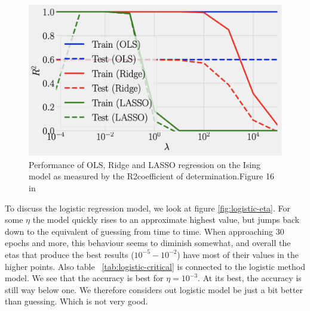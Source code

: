 \begin{figure}[H]
\includegraphics[width = 0.6\paperwidth]{figures/R2_article.png}
\caption{Performance of OLS, Ridge and LASSO regression on the Ising model as measured by the R2coefficient of determination.Figure 16 in ~\cite{HighBias}} 
\label{fig:regression-r2-article}
\end{figure}

To discuss the logistic regression model, 
we look at figure \ref{fig:logistic-eta}. For some $\eta$ the model 
quickly rises to an approximate highest value, but jumps back down to 
the equivalent of guessing from time
to time. When approaching 30 epochs and more, this behaviour 
seems to diminish somewhat, and overall the etas that produce 
the best results ($10^{-5} - 10^{-2}$) have most of their values
in the higher points.
Also table ~\ref{tab:logistic-critical} is connected 
to the logistic method model. We see that the accuracy is best
for \(\eta = 10^{-3}\). At its best, the accuracy is still 
way below one. We therefore considers out logistic model be just 
a bit better than guessing. Which is not very good. 



